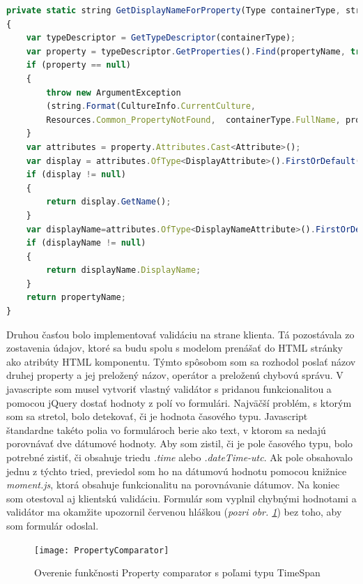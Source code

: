 \documentclass[11pt, oneside]{report}
\begin{document}
\begin{lstlisting}[language=Javascript,showstringspaces=false, caption= Klientská validácia - získanie preloženého mena,captionpos=b,label={lst:displayname}]
private static string GetDisplayNameForProperty(Type containerType, string propertyName)
{
    var typeDescriptor = GetTypeDescriptor(containerType);
    var property = typeDescriptor.GetProperties().Find(propertyName, true);
    if (property == null)
    {
        throw new ArgumentException
        (string.Format(CultureInfo.CurrentCulture, 
        Resources.Common_PropertyNotFound,  containerType.FullName, propertyName));
    }
    var attributes = property.Attributes.Cast<Attribute>();
    var display = attributes.OfType<DisplayAttribute>().FirstOrDefault();
    if (display != null)
    {
        return display.GetName();
    }
    var displayName=attributes.OfType<DisplayNameAttribute>().FirstOrDefault();
    if (displayName != null)
    {
        return displayName.DisplayName;
    }
    return propertyName;
}
\end{lstlisting}
Druhou časťou bolo implementovať validáciu na strane klienta. Tá pozostávala zo zostavenia údajov, ktoré sa budu spolu s modelom  prenášať do HTML stránky ako atribúty HTML komponentu. Týmto spôsobom som sa rozhodol poslať názov druhej property a jej preložený názov, operátor a preloženú chybovú správu. V javascripte som musel  vytvoriť vlastný validátor s pridanou funkcionalitou a pomocou jQuery dostať hodnoty z polí vo formulári. Najväčší problém, s ktorým som sa stretol, bolo detekovať, či je hodnota časového typu. Javascript štandardne takéto polia  vo formulároch  berie ako text, v ktorom sa nedajú porovnávať dve dátumové hodnoty. Aby som zistil, či je pole časového typu, bolo potrebné zistiť, či obsahuje triedu \textit{.time} alebo \textit{.dateTime-utc}. Ak pole obsahovalo jednu z týchto tried, previedol som ho na dátumovú hodnotu pomocou knižnice \textit{moment.js}, ktorá obsahuje funkcionalitu na porovnávanie  dátumov. Na koniec som otestoval aj klientskú validáciu. Formulár som vyplnil chybnými hodnotami a validátor ma okamžite upozornil  červenou hláškou (\textit{pozri obr. \ref{fig:propertycompare}}) bez toho, aby som formulár odoslal.
\begin{figure}[H]
    \centering
    \texttt{[image: PropertyComparator]}
    \caption{Overenie funkčnosti Property comparator s poľami typu TimeSpan}
    \label{fig:propertycompare}
\end{figure}
\newpage
\end{document}
